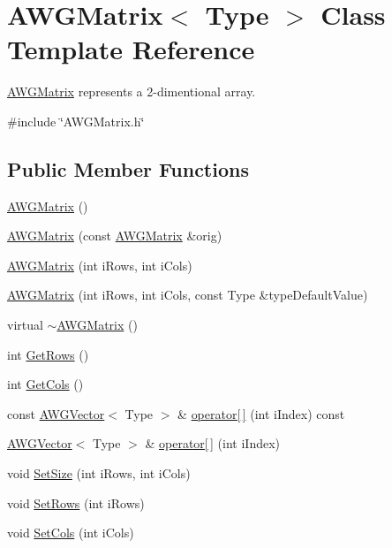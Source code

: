 \hypertarget{classAWGMatrix}{
\section{AWGMatrix$<$ Type $>$ Class Template Reference}
\label{classAWGMatrix}
}


\hyperlink{classAWGMatrix}{AWGMatrix} represents a 2-\/dimentional array.  


{\ttfamily \#include \char`\"{}AWGMatrix.h\char`\"{}}\subsection*{Public Member Functions}
\begin{DoxyCompactItemize}
\item 
\hyperlink{classAWGMatrix_a448480dff93d24168d109b93c7db3f2c}{AWGMatrix} ()
\item 
\hyperlink{classAWGMatrix_a31214755b0daaca36248e2ca794c776c}{AWGMatrix} (const \hyperlink{classAWGMatrix}{AWGMatrix} \&orig)
\item 
\hyperlink{classAWGMatrix_a7b3f96ca9aaad6bf1de3170db7225bd5}{AWGMatrix} (int iRows, int iCols)
\item 
\hyperlink{classAWGMatrix_a25a1a3309975aabb6a1dc89a1163f24c}{AWGMatrix} (int iRows, int iCols, const Type \&typeDefaultValue)
\item 
virtual \hyperlink{classAWGMatrix_aedeef2430ef09118c42668d50f11b755}{$\sim$AWGMatrix} ()
\item 
int \hyperlink{classAWGMatrix_a26d9705feb63ce376cc386a3e96f83b5}{GetRows} ()
\item 
int \hyperlink{classAWGMatrix_a9e7cfb5fc604eed9b7a6eab8e0dda9fd}{GetCols} ()
\item 
const \hyperlink{classAWGVector}{AWGVector}$<$ Type $>$ \& \hyperlink{classAWGMatrix_a0acfd19666f1a8c7e0a39d4606ff8247}{operator\mbox{[}$\,$\mbox{]}} (int iIndex) const 
\item 
\hyperlink{classAWGVector}{AWGVector}$<$ Type $>$ \& \hyperlink{classAWGMatrix_a3bc6ae621b7205dbb523b1d8d62d6602}{operator\mbox{[}$\,$\mbox{]}} (int iIndex)
\item 
void \hyperlink{classAWGMatrix_a8a1bf260b9969f8fb7119b65384181b0}{SetSize} (int iRows, int iCols)
\item 
void \hyperlink{classAWGMatrix_a8af3512aa03ae0142f49ede0a7a10e89}{SetRows} (int iRows)
\item 
void \hyperlink{classAWGMatrix_a6bb6e928d147d77d7788634bdac248b6}{SetCols} (int iCols)
\end{DoxyCompactItemize}


